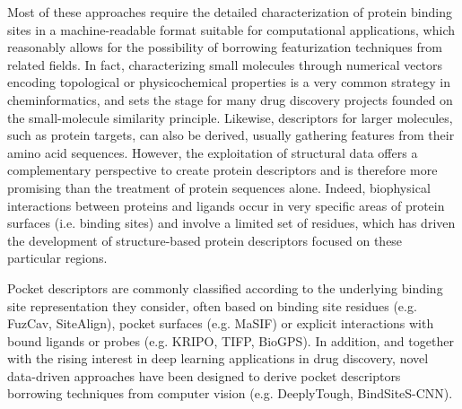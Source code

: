 Most of these approaches require the detailed characterization of protein binding sites in a machine-readable format suitable for computational applications, which reasonably allows for the possibility of borrowing featurization techniques from related fields. In fact, characterizing small molecules through numerical vectors encoding topological or physicochemical properties is a very common strategy in cheminformatics, and sets the stage for many drug discovery projects founded on the small-molecule similarity principle\cite{fernandez-torras_connecting_2022, cereto-massague_molecular_2015, muegge_overview_2016}. Likewise, descriptors for larger molecules, such as protein targets, can also be derived, usually gathering features from their amino acid sequences\cite{bileschi_using_2022}. However, the exploitation of structural data offers a complementary perspective to create protein descriptors and is therefore more promising than the treatment of protein sequences alone. Indeed, biophysical interactions between proteins and ligands occur in very specific areas of protein surfaces (i.e. binding sites) and involve a limited set of residues, which has driven the development of structure-based protein descriptors focused on these particular regions\cite{eguida_estimating_2022}.

Pocket descriptors are commonly classified according to the underlying binding site representation they consider, often based on binding site residues (e.g. FuzCav\cite{weill_alignment-free_2010}, SiteAlign\cite{schalon_simple_2008}), pocket surfaces (e.g. MaSIF\cite{gainza_deciphering_2020}) or explicit interactions with bound ligands or probes (e.g. KRIPO\cite{wood_pharmacophore_2012}, TIFP\cite{desaphy_encoding_2013}, BioGPS\cite{siragusa_biogps_2015}). In addition, and together with the rising interest in deep learning applications in drug discovery\cite{chen_rise_2018}, novel data-driven approaches have been designed to derive pocket descriptors borrowing techniques from computer vision (e.g. DeeplyTough\cite{simonovsky_deeplytough_2020}, BindSiteS-CNN\cite{scott_classification_2022}). 